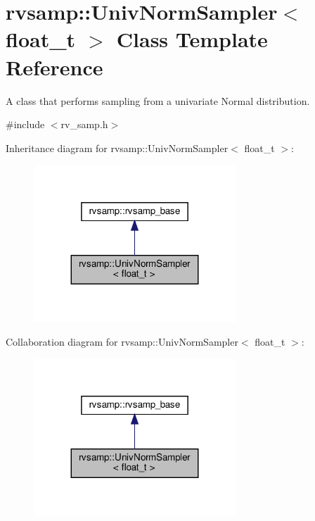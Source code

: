 \hypertarget{classrvsamp_1_1UnivNormSampler}{}\section{rvsamp\+:\+:Univ\+Norm\+Sampler$<$ float\+\_\+t $>$ Class Template Reference}
\label{classrvsamp_1_1UnivNormSampler}


A class that performs sampling from a univariate Normal distribution.  




{\ttfamily \#include $<$rv\+\_\+samp.\+h$>$}



Inheritance diagram for rvsamp\+:\+:Univ\+Norm\+Sampler$<$ float\+\_\+t $>$\+:
\nopagebreak
\begin{figure}[H]
\begin{center}
\leavevmode
\includegraphics[width=215pt]{classrvsamp_1_1UnivNormSampler__inherit__graph}
\end{center}
\end{figure}


Collaboration diagram for rvsamp\+:\+:Univ\+Norm\+Sampler$<$ float\+\_\+t $>$\+:
\nopagebreak
\begin{figure}[H]
\begin{center}
\leavevmode
\includegraphics[width=215pt]{classrvsamp_1_1UnivNormSampler__coll__graph}
\end{center}
\end{figure}
